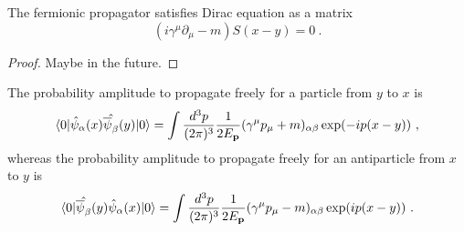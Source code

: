     The fermionic propagator satisfies Dirac equation as a matrix 
    \begin{equation*}
        (i \gamma^\mu \partial_\mu - m) S(x-y) = 0~.
    \end{equation*}
    \begin{proof}
        Maybe in the future.
    \end{proof}

    The probability amplitude to propagate freely for a particle from $y$ to $x$ is 
    \begin{equation*}
        \langle0\vert \hat \psi_\alpha (x) \hat {\overline \psi_\beta} (y) \vert0\rangle = \int \frac{d^3 p}{(2\pi)^3} \frac{1}{2E_{\mathbf p}} (\gamma^\mu p_\mu + m)_{\alpha\beta} \exp(- i p (x-y)) ~,
    \end{equation*}
    whereas the probability amplitude to propagate freely for an antiparticle from $x$ to $y$ is 
    \begin{equation*}
        \langle0\vert \hat {\overline \psi_\beta} (y) \hat \psi_\alpha (x) \vert0\rangle = \int \frac{d^3 p}{(2\pi)^3} \frac{1}{2E_{\mathbf p}} (\gamma^\mu p_\mu - m)_{\alpha\beta} \exp(i p (x-y)) ~.
    \end{equation*}
